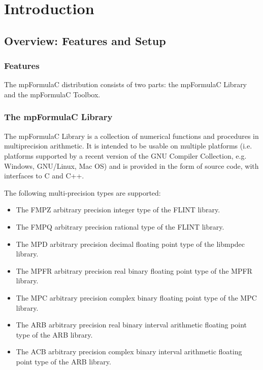 \chapter{Introduction}
\label{Introduction1} 



\section{Overview: Features and Setup}


\subsection{Features}
The mpFormulaC distribution consists of two parts: the mpFormulaC Library and the mpFormulaC Toolbox.

\subsection{The mpFormulaC Library}

The mpFormulaC Library is a collection of numerical functions and procedures in multiprecision arithmetic. It is intended to be usable on multiple platforms (i.e. platforms supported by a recent version of the GNU Compiler Collection, e.g. Windows, GNU/Linux, Mac OS) and is provided in the form of source code, with interfaces to C and C++. 

The following multi-precision types are supported:

\begin{itemize}		
  \item The FMPZ arbitrary precision integer type of the FLINT library. 
  \item The FMPQ arbitrary precision rational type of the FLINT library. 
  \item The MPD arbitrary precision decimal floating point type of the libmpdec library. 
  \item The MPFR arbitrary precision real binary floating point type of the MPFR library.
  \item The MPC arbitrary precision complex binary floating point type of the MPC library.
  \item The ARB arbitrary precision real binary interval arithmetic floating point type of the ARB library.
  \item The ACB arbitrary precision complex binary interval arithmetic floating point type of the ARB library.   
\end{itemize}

